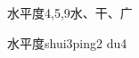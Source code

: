 \begin{entry}{水平度}{4,5,9}{⽔、⼲、⼴}
  \begin{phonetics}{水平度}{shui3ping2 du4}
  \end{phonetics}
\end{entry}
